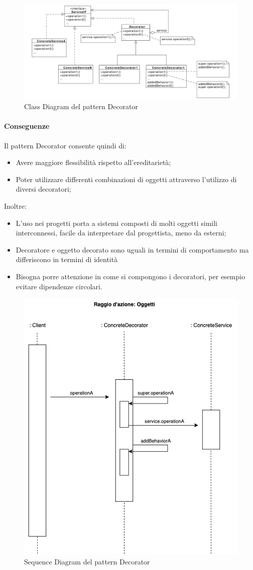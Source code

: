 \begin{figure}[H]
    \centering
    \includegraphics[width=0.75\linewidth]{assets/pattern/decorator/decorator-struttura.png}
    \caption{Class Diagram del pattern Decorator}
\end{figure}

\paragraph{Conseguenze} Il pattern Decorator consente quindi di:
\begin{itemize}
    \item Avere maggiore flessibilità rispetto all'ereditarietà;
    \item Poter utilizzare differenti combinazioni di oggetti attraverso l'utilizzo di diversi decoratori;
\end{itemize}
Inoltre:
\begin{itemize}
    \item L'uso nei progetti porta a sistemi composti di molti oggetti simili interconnessi, facile da interpretare dal progettista, meno da esterni;
    \item Decoratore e oggetto decorato sono uguali in termini di comportamento ma differiscono in termini di identità
    \item Bisogna porre attenzione in come si compongono i decoratori, per esempio evitare dipendenze circolari.
\end{itemize}

\begin{figure}[H]
    \centering
    \includegraphics[width=0.75\linewidth]{assets/pattern/decorator/decorator-sequence.drawio.png}
    \caption{Sequence Diagram del pattern Decorator}
\end{figure}


\newpage